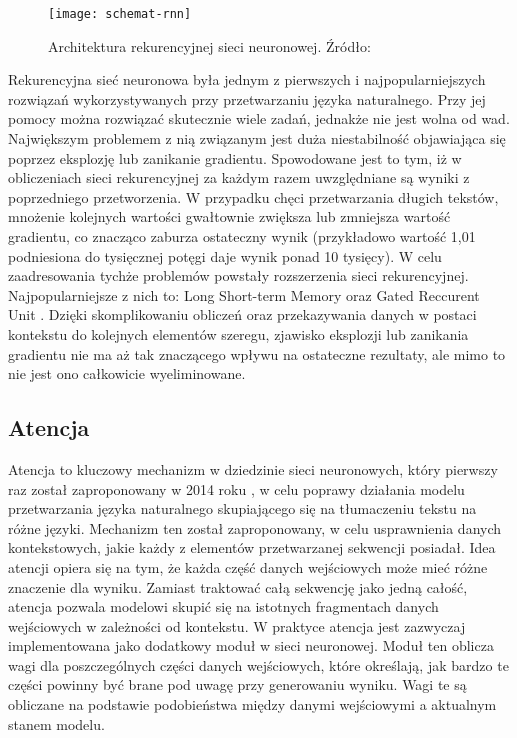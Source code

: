 \begin{figure}[H]
  \centering
  \texttt{[image: schemat-rnn]}
  \caption{Architektura rekurencyjnej sieci neuronowej. Źródło: \cite{WikipediaEN:RNN}}
  \label{fig:schemat-rnn}
\end{figure}
\noindent Rekurencyjna sieć neuronowa była jednym z pierwszych i najpopularniejszych rozwiązań wykorzystywanych przy przetwarzaniu języka naturalnego. Przy jej pomocy można rozwiązać skutecznie wiele zadań, jednakże nie jest wolna od wad. Największym problemem z nią związanym jest duża niestabilność objawiająca się poprzez eksplozję lub zanikanie gradientu. Spowodowane jest to tym, iż w obliczeniach sieci rekurencyjnej za każdym razem uwzględniane są wyniki z poprzedniego przetworzenia. W przypadku chęci przetwarzania długich tekstów, mnożenie kolejnych wartości gwałtownie zwiększa lub zmniejsza wartość gradientu, co znacząco zaburza ostateczny wynik (przykładowo wartość 1,01 podniesiona do tysięcznej potęgi daje wynik ponad 10 tysięcy). W celu zaadresowania tychże problemów powstały rozszerzenia sieci rekurencyjnej. Najpopularniejsze z nich to: Long Short-term Memory \cite{lstm} oraz Gated Reccurent Unit \cite{gru}. Dzięki skomplikowaniu obliczeń oraz przekazywania danych w postaci kontekstu do kolejnych elementów szeregu, zjawisko eksplozji lub zanikania gradientu nie ma aż tak znaczącego wpływu na ostateczne rezultaty, ale mimo to nie jest ono całkowicie wyeliminowane.
\subsection{Atencja}
Atencja to kluczowy mechanizm w dziedzinie sieci neuronowych, który pierwszy raz został zaproponowany w 2014 roku \cite{attention}, w celu poprawy działania modelu przetwarzania języka naturalnego skupiającego się na tłumaczeniu tekstu na różne języki. Mechanizm ten został zaproponowany, w celu usprawnienia danych kontekstowych, jakie każdy z elementów przetwarzanej sekwencji posiadał. Idea atencji opiera się na tym, że każda część danych wejściowych może mieć różne znaczenie dla wyniku. Zamiast traktować całą sekwencję jako jedną całość, atencja pozwala modelowi skupić się na istotnych fragmentach danych wejściowych w zależności od kontekstu. W praktyce atencja jest zazwyczaj implementowana jako dodatkowy moduł w sieci neuronowej. Moduł ten oblicza wagi dla poszczególnych części danych wejściowych, które określają, jak bardzo te części powinny być brane pod uwagę przy generowaniu wyniku. Wagi te są obliczane na podstawie podobieństwa między danymi wejściowymi a aktualnym stanem modelu.

